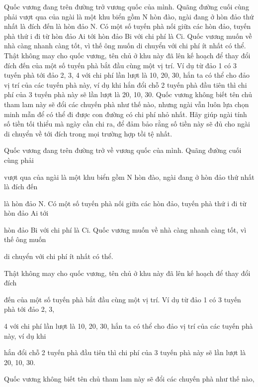 



     Quốc vương đang trên đường trở vương quốc của mình. Quãng đường cuối cùng phải       vượt qua của ngài là một khu biển gồm N hòn đào, ngài đang ở hòn đảo thứ nhất là đích đến       là hòn đảo N. Có một số tuyến phà nối giữa các hòn đảo, tuyến phà thứ i đi từ hòn đảo Ai tới       hòn đảo Bi với chi phí là Ci. Quốc vương muốn về nhà càng nhanh càng tốt, vì thế ông muốn       di chuyển với chi phí ít nhất có thể.       Thật không may cho quốc vương, tên chủ ở khu này đã lên kế hoạch để thay đổi đích       đến của một số tuyến phà bắt đầu cùng một vị trí. Ví dụ từ đảo 1 có 3 tuyến phà tới đảo 2, 3,       4 với chi phí lần lượt là 10, 20, 30, hắn ta có thể cho đảo vị trí của các tuyến phà này, ví dụ khi       hắn đổi chỗ 2 tuyến phà đầu tiên thì chi phí của 3 tuyến phà này sẽ lần lượt là 20, 10, 30.       Quốc vương không biết tên chủ tham lam này sẽ đổi các chuyến phà như thế nào,       nhưng ngài vẫn luôn lựa chọn minh mẫn để có thể đi được con đường có chi phí nhỏ nhất.       Hãy giúp ngài tính số tiền tối thiểu mà ngày cần chi ra, để đảm bảo rằng số tiền này sẽ đủ cho       ngài di chuyển về tới đích trong mọi trường hợp tồi tệ nhất.    

   Quốc vương đang trên đường trở về vương quốc của mình. Quãng đường cuối cùng phải  

   vượt qua của ngài là một khu biển gồm N hòn đào, ngài đang ở hòn đảo thứ nhất là đích đến  

   là hòn đảo N. Có một số tuyến phà nối giữa các hòn đảo, tuyến phà thứ i đi từ hòn đảo Ai tới  

   hòn đảo Bi với chi phí là Ci. Quốc vương muốn về nhà càng nhanh càng tốt, vì thế ông muốn  

   di chuyển với chi phí ít nhất có thể.  



   Thật không may cho quốc vương, tên chủ ở khu này đã lên kế hoạch để thay đổi đích  

   đến của một số tuyến phà bắt đầu cùng một vị trí. Ví dụ từ đảo 1 có 3 tuyến phà tới đảo 2, 3,  

   4 với chi phí lần lượt là 10, 20, 30, hắn ta có thể cho đảo vị trí của các tuyến phà này, ví dụ khi  

   hắn đổi chỗ 2 tuyến phà đầu tiên thì chi phí của 3 tuyến phà này sẽ lần lượt là 20, 10, 30.  

   Quốc vương không biết tên chủ tham lam này sẽ đổi các chuyến phà như thế nào,  

